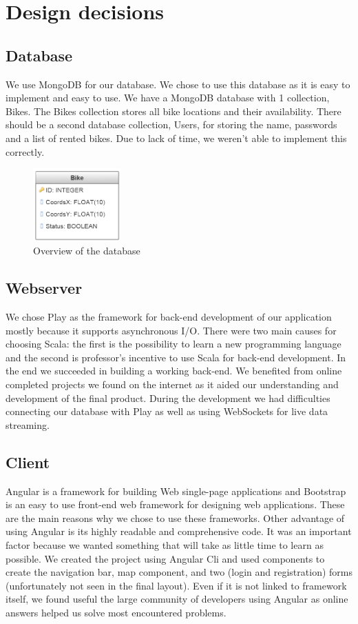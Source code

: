 \section{Design decisions}

\subsection{Database}
We use MongoDB for our database. We chose to use this database as it is easy to implement and easy to use. We have
a MongoDB database with 1 collection, Bikes. The Bikes collection stores all bike locations and their availability. There should be a second database collection, Users, for storing the name, passwords and a list of rented bikes. Due to lack of time, we weren't able to implement this correctly.


    \begin{figure}[H]
		\centering
		\includegraphics[width=0.3\textwidth]{images/db-structure.png}
		\caption{Overview of the database}
		\label{database}
	\end{figure}


\subsection{Webserver}
We chose Play as the framework for back-end development of our application mostly because it supports asynchronous I/O. There were two main causes for choosing Scala: the first is the possibility to learn a new programming language and the second is professor's incentive to use Scala for back-end development. In the end we succeeded in building a working back-end. We benefited from online completed projects we found on the internet as it aided our understanding and development of the final product. During the development we had difficulties connecting our database with Play as well as using WebSockets for live data streaming.

\subsection{Client}
Angular is a framework for building Web single-page applications and Bootstrap is an easy to use front-end web framework for designing web applications. These are the main reasons why we chose to use these frameworks. Other advantage of using Angular is its highly readable and comprehensive code. It was an important factor because we wanted something that will take as little time to learn as possible. We created the project using Angular Cli and used components to create the navigation bar, map component, and two (login and registration) forms (unfortunately not seen in the final layout). Even if it is not linked to framework itself, we found useful the large community of developers using Angular as online answers helped us solve most encountered problems.

